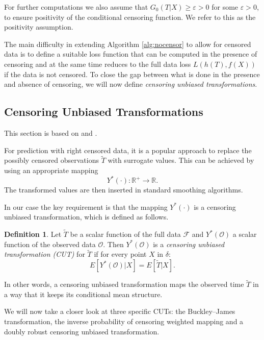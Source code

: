 \documentclass[12pt, a4paper]{scrartcl}
\theoremstyle{definition}
\newtheorem{Definition}{Definition}[section]
\theoremstyle{plain}
\numberwithin{equation}{section}
\numberwithin{figure}{section}
\numberwithin{table}{section}
\begin{document}
	 For further computations we also assume that $G_0(T \vert X)\geq \varepsilon > 0$ for some $\varepsilon >0$, to ensure positivity of the conditional censoring function.
	 We refer to this as the positivity assumption.
	
	The main difficulty in extending Algorithm \ref{alg:nocensor} to allow for censored data is to define a suitable loss function that can be computed in the presence of censoring and at the same time reduces to the full data loss $L(h(T), f(X))$ if the data is not censored.
	To close the gap between what is done in the presence and absence of censoring, we will now define \textit{censoring unbiased transformations}.
	
	\subsection{Censoring Unbiased Transformations}\label{sec:drtrafo}
	This section is based on \citet*{culs} and \citet*{drcut}.
	
	For prediction with right censored data, it is a popular approach to replace the possibly censored observations $\tilde T$ with surrogate values.
	This can be achieved by using an appropriate mapping $$Y^*(\cdot): \mathbb{R}^+ \to \mathbb{R}.$$
	The transformed values are then inserted in standard smoothing algorithms.
	
	In our case the key requirement is that the mapping $Y^*(\cdot)$ is a censoring unbiased transformation, which is defined as follows.
	
	\begin{Definition}
	Let $\tilde T$ be a scalar function of the full data $\mathcal{F}$ and $Y^*(\mathcal{O})$ a scalar function of the observed data $\mathcal{O}$.
	Then $Y^*(\mathcal{O})$ is a \textit{censoring unbiased transformation (CUT)} for $\tilde T$ if for every point $X$ in $\delta$:
	\begin{equation*}
	E[Y^*(\mathcal{O}) \vert X] = E[\tilde T \vert X].
	\end{equation*}
	\end{Definition}

	In other words, a censoring unbiased transformation maps the observed time $\tilde T$ in a way that it keeps its conditional mean structure.
	
	We will now take a closer look at three specific CUTs: the Buckley--James transformation, the inverse probability of censoring weighted mapping and a doubly robust censoring unbiased transformation.
	
\end{document}
